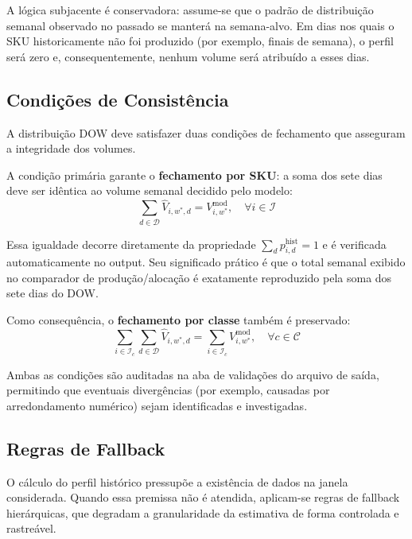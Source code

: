 \documentclass[11pt,a4paper]{article}
\begin{document}
A lógica subjacente é conservadora: assume-se que o padrão de distribuição
semanal observado no passado se manterá na semana-alvo. Em dias nos quais o
SKU historicamente não foi produzido (por exemplo, finais de semana), o perfil
será zero e, consequentemente, nenhum volume será atribuído a esses dias.

\subsection{Condições de Consistência}

A distribuição DOW deve satisfazer duas condições de fechamento que asseguram
a integridade dos volumes.

A condição primária garante o \textbf{fechamento por SKU}: a soma dos sete
dias deve ser idêntica ao volume semanal decidido pelo modelo:
\begin{equation}\label{eq:dow:consistencia-sku}
\sum_{d \in \mathcal{D}} \hat{V}_{i,w^*,d} = V^{\text{mod}}_{i,w^*},
\quad \forall i \in \mathcal{I}
\end{equation}

Essa igualdade decorre diretamente da propriedade
$\sum_d p^{\text{hist}}_{i,d} = 1$ e é verificada automaticamente no output.
Seu significado prático é que o total semanal exibido no comparador de
produção/alocação é exatamente reproduzido pela soma dos sete dias do DOW.

Como consequência, o \textbf{fechamento por classe} também é preservado:
\begin{equation}\label{eq:dow:consistencia-classe}
\sum_{i \in \mathcal{I}_c} \sum_{d \in \mathcal{D}} \hat{V}_{i,w^*,d}
= \sum_{i \in \mathcal{I}_c} V^{\text{mod}}_{i,w^*},
\quad \forall c \in \mathcal{C}
\end{equation}

Ambas as condições são auditadas na aba de validações do arquivo de saída,
permitindo que eventuais divergências (por exemplo, causadas por
arredondamento numérico) sejam identificadas e investigadas.

\subsection{Regras de Fallback}

O cálculo do perfil histórico pressupõe a existência de dados na janela
considerada. Quando essa premissa não é atendida, aplicam-se regras de
fallback hierárquicas, que degradam a granularidade da estimativa de forma
controlada e rastreável.
\end{document}
